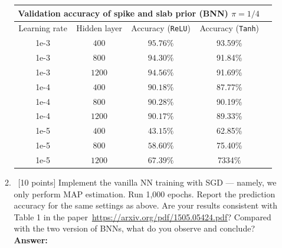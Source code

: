 \documentclass[12pt, fullpage,letterpaper]{article}
\def\red{\color{black!30!red}}
\def\blackblue{\color{black!40!blue}}
\begin{document}
\begin{enumerate}
\begin{enumerate}
{		\begin{center}
\begin{tabular}{ |c||c|c|c|c|}
 \hline
 \multicolumn{4}{|c|}{Validation accuracy of spike and slab prior (BNN) $\pi = 1/4$} \\
 \hline
Learning rate & Hidden layer &  Accuracy (\texttt{ReLU}) & Accuracy (\texttt{Tanh})\\
 \hline
 1e-3   & $400$     & $95.76\%$ &   93.59\%\\ 
 \hline
 1e-3   & $800$     & $94.30\%$  &  91.84\%\\
 \hline
 1e-3   & $1200$   & $94.56\%$  &  91.69\%\\
  \hline
 \hline
 1e-4   & $400$      & $90.18\%$& 87.77\%\\  
 \hline
 1e-4   & $800$      & $90.28\%$ &  90.19\%\\
\hline
 1e-4   & $1200$    & $90.17\%$ &  89.33\%\\ 
 \hline
 \hline
 1e-5   & $400$    & $43.15\%$ &  62.85\%\\  
 \hline
 1e-5   & $800$    & $58.60\%$ &  75.40\%\\
\hline
 1e-5   & $1200$    & $67.39\%$ &  7334\%\\
 \hline
\end{tabular}
\end{center}		
}		

		
		\item~[10 points] Implement the vanilla NN training with SGD --- namely, we only perform MAP estimation. Run 1,000 epochs. Report the prediction accuracy for the same settings as above. Are your results consistent with Table 1 in the paper~\url{https://arxiv.org/pdf/1505.05424.pdf}? Compared with the two version of BNNs, what do you observe and conclude? \\
{\bf \red Answer: }{\blackblue 
		
}
\end{enumerate}
\end{enumerate}
\end{document}
